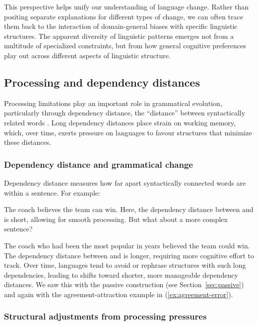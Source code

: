 This perspective helps unify our understanding of language change. Rather than positing separate explanations for different types of change, we can often trace them back to the interaction of domain-general biases with specific linguistic structures. The apparent diversity of linguistic patterns emerges not from a multitude of specialized constraints, but from how general cognitive preferences play out across different aspects of linguistic structure.

\subsection{Processing and dependency distances}

Processing limitations play an important role in grammatical evolution, particularly through dependency distance, the \enquote{distance} between syntactically related words \citep{Gibson2013a,Gibson2025Syntax}. Long dependency distances place strain on working memory, which, over time, exerts pressure on languages to favour structures that minimize these distances.

\subsubsection{Dependency distance and grammatical change}

Dependency distance measures how far apart syntactically connected words are within a sentence. For example:

\ea
The coach believes the team can win.
\z
Here, the dependency distance between  and  is short, allowing for smooth processing. But what about a more complex sentence?

\ea
The coach who had been the most popular in years believed the team could win.
\z
The dependency distance between  and  is longer, requiring more cognitive effort to track. Over time, languages tend to avoid or rephrase structures with such long dependencies, leading to shifts toward shorter, more manageable dependency distances. We saw this with the passive construction (see Section~\ref{sec:passive}) and again with the agreement-attraction example in (\ref{ex:agreement-error}).

\subsubsection{Structural adjustments from processing pressures}

